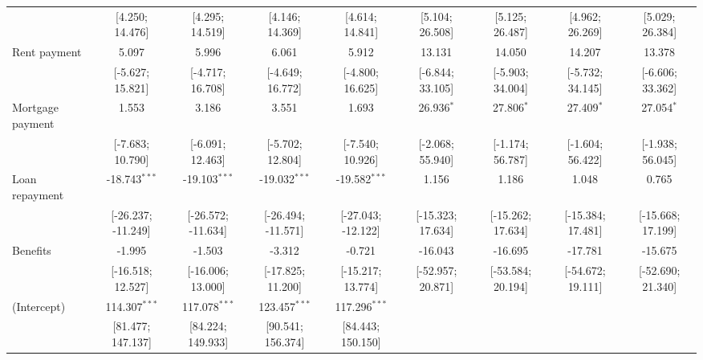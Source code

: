 \begin{table}[htbp]
\begin{threeparttable}[b]
\begin{tabular}{lcccccccc}
                                     & [4.250; 14.476]    & [4.295; 14.519]    & [4.146; 14.369]    & [4.614; 14.841]    & [5.104; 26.508]     & [5.125; 26.487]     & [4.962; 26.269]     & [5.029; 26.384]\\   
         Rent payment                & 5.097              & 5.996              & 6.061              & 5.912              & 13.131              & 14.050              & 14.207              & 13.378\\   
                                     & [-5.627; 15.821]   & [-4.717; 16.708]   & [-4.649; 16.772]   & [-4.800; 16.625]   & [-6.844; 33.105]    & [-5.903; 34.004]    & [-5.732; 34.145]    & [-6.606; 33.362]\\   
         Mortgage payment            & 1.553              & 3.186              & 3.551              & 1.693              & 26.936$^{*}$        & 27.806$^{*}$        & 27.409$^{*}$        & 27.054$^{*}$\\   
                                     & [-7.683; 10.790]   & [-6.091; 12.463]   & [-5.702; 12.804]   & [-7.540; 10.926]   & [-2.068; 55.940]    & [-1.174; 56.787]    & [-1.604; 56.422]    & [-1.938; 56.045]\\   
         Loan repayment              & -18.743$^{***}$    & -19.103$^{***}$    & -19.032$^{***}$    & -19.582$^{***}$    & 1.156               & 1.186               & 1.048               & 0.765\\   
                                     & [-26.237; -11.249] & [-26.572; -11.634] & [-26.494; -11.571] & [-27.043; -12.122] & [-15.323; 17.634]   & [-15.262; 17.634]   & [-15.384; 17.481]   & [-15.668; 17.199]\\   
         Benefits                    & -1.995             & -1.503             & -3.312             & -0.721             & -16.043             & -16.695             & -17.781             & -15.675\\   
                                     & [-16.518; 12.527]  & [-16.006; 13.000]  & [-17.825; 11.200]  & [-15.217; 13.774]  & [-52.957; 20.871]   & [-53.584; 20.194]   & [-54.672; 19.111]   & [-52.690; 21.340]\\   
         (Intercept)                 & 114.307$^{***}$    & 117.078$^{***}$    & 123.457$^{***}$    & 117.296$^{***}$    &                     &                     &                     &   \\   
                                     & [81.477; 147.137]  & [84.224; 149.933]  & [90.541; 156.374]  & [84.443; 150.150]  &                     &                     &                     &   \\   

\end{tabular}
\end{threeparttable}
\end{table}
